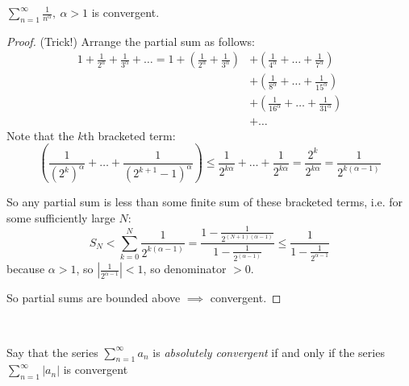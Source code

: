 \begin{example}
$\sum_{n=1}^{\infty} \frac{1}{n^{\alpha}},~ \alpha > 1$ is convergent.
\begin{proof}
(Trick!) Arrange the partial sum as follows:
\[\begin{aligned}
1 + \frac{1}{2^\alpha} + \frac{1}{3^\alpha} + \dots  = 1 + \left(\frac{1}{2^\alpha} + \frac{1}{3^\alpha}\right) &+ \left(\frac{1}{4^\alpha} + \dots +\frac{1}{7^\alpha}\right)  \\ 
&+ \left(\frac{1}{8^\alpha} + \dots + \frac{1}{15^\alpha}\right) \\
&+ \left(\frac{1}{16^\alpha} + \dots + \frac{1}{31^\alpha}\right) \\
&+ \dots  \end{aligned}\]
Note that the $k$th bracketed term:
\[\left(\frac{1}{(2^k)^\alpha} + \dots +\frac{1}{(2^{k+1}-1)^\alpha}\right ) \leq \frac{1}{2^{k\alpha}} + \dots + \frac{1}{2^{k\alpha}} = \frac{2^k}{2^{k\alpha}} = \frac{1}{2^{k(\alpha-1)}}\]

So any partial sum is less than some finite sum of these bracketed terms, i.e. for some sufficiently large $N$: \[ S_N < \sum_{k=0}^{N} \frac{1}{2^{k(\alpha -1)}} = \frac{1-\frac{1}{2^{(N+1)(\alpha -1)}}}{1-\frac{1}{2^{(\alpha-1)}}} \leq \frac{1}{1-\frac{1}{2^{\alpha-1}}}\] because $\alpha >1$, so $\left|\frac{1}{2^{\alpha-1}}\right| < 1$, so denominator $>0$. 

So partial sums are bounded above $\implies$ convergent. 
\end{proof}	
\end{example}~

\begin{definition}
Say that the series $\sum_{n=1}^{\infty}a_n$ is \emph{absolutely convergent} if and only if the series $\sum_{n=1}^{\infty} |a_n|$ is convergent	
\end{definition}~

